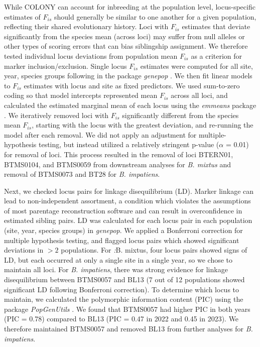 \documentclass[11pt]{article}
\begin{document}
While COLONY can account for inbreeding at the population level, locus-specific estimates of $F_{is}$ should generally be similar to one another for a given population, reflecting their shared evolutionary history. Loci with $F_{is}$ estimates that deviate significantly from the species mean (across loci) may suffer from null alleles or other types of scoring errors that can bias siblingship assignment. We therefore tested individual locus deviations from population mean $F_{is}$ as a criterion for marker inclusion/exclusion. Single locus $F_{is}$ estimates were computed for all site, year, species groups following \parencite{weir_estimating_1984} in the package \emph{genepop} \parencite{rousset_genepop007_2008}. We then fit linear models to $F_{is}$ estimates with locus and site as fixed predictors. We used sum-to-zero coding so that model intercepts represented mean $F_{is}$ across all loci, and calculated the estimated marginal mean of each locus using the \emph{emmeans} package \parencite{lenth_emmeans_2024}. We iteratively removed loci with $F_{is}$ significantly different from the species mean $F_{is}$, starting with the locus with the greatest deviation, and re-running the model after each removal. We did not apply an adjustment for multiple-hypothesis testing, but instead utilized a relatively stringent p-value ($\alpha$ = 0.01) for removal of loci. This process resulted in the removal of loci BTERN01, BTMS0104, and BTMS0059 from downstream analyses for \emph{B. mixtus} and removal of BTMS0073 and BT28 for \emph{B. impatiens}.

Next, we checked locus pairs for linkage disequilibrium (LD). Marker linkage can lead to non-independent assortment, a condition which violates the assumptions of most parentage reconstruction software and can result in overconfidence in estimated sibling pairs. LD was calculated for each locus pair in each population (site, year, species groups) in \emph{genepop}. We applied a Bonferroni correction for multiple hypothesis testing, and flagged locus pairs which showed significant deviations in $>2$ populations. For \emph:{B. mixtus}, four locus pairs showed signs of LD, but each occurred at only a single site in a single year, so we chose to maintain all loci. For \emph{B. impatiens}, there was strong evidence for linkage disequilibrium between BTMS0057 and BL13 (7 out of 12 populations showed significant LD following Bonferroni correction). To determine which locus to maintain, we calculated the polymorphic information content (PIC) using the package \emph{PopGenUtils} \parencite{tourvas_popgenutils_2025}. We found that BTMS0057 had higher PIC in both years (PIC = 0.78) compared to BL13 (PIC = 0.47 in 2022 and 0.45 in 2023). We therefore maintained BTMS0057 and removed BL13 from further analyses for \emph{B. impatiens}.
\end{document}
